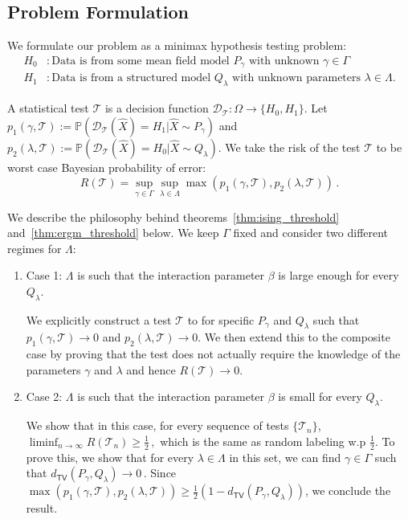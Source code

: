 \documentclass[final,12pt]{colt2018}
\begin{document}
\subsection{Problem Formulation}
We formulate our problem as a minimax hypothesis testing problem:
\begin{align*}
H_0 &: \text{Data is from some mean field model $P_\gamma$ with unknown $\gamma\in \Gamma$} \\
H_1 &: \text{Data is from a structured model $Q_{\lambda}$ with unknown parameters $\lambda \in \Lambda $.}
\end{align*}



A statistical test $\mathcal{T}$ is a decision function $\mathcal{D}_{\mathcal{T}}:\Omega \to \{H_0,H_1\}$. Let $p_1(\gamma, \mathcal{T}):= \mathbb{P}(\mathcal{D}_{\mathcal{T}}(\hat{X}) = H_1| \hat{X} \sim P_{\gamma})$ and $p_2(\lambda,\mathcal{T}) := \mathbb{P}(\mathcal{D}_{\mathcal{T}}(\hat{X}) = H_0| \hat{X} \sim Q_{\lambda})$. We take the risk of the test $\mathcal{T}$ to be worst case Bayesian probability of error:
$$R(\mathcal{T}) = \sup_{\gamma \in \Gamma}\sup_{\lambda \in \Lambda} \max(p_1(\gamma, \mathcal{T}),p_2(\lambda, \mathcal{T}))\,.$$

We describe the philosophy behind theorems~\ref{thm:ising_threshold} and~\ref{thm:ergm_threshold} below. We keep $\Gamma$ fixed and consider two different regimes for $\Lambda$:
\begin{enumerate}
\item Case 1:
$\Lambda$ is such that the interaction parameter $\beta$ is large enough for every $Q_{\lambda}$. 

We explicitly construct a test  $\mathcal{T}$ to for specific $P_{\gamma}$ and $Q_{\lambda}$ such that $p_1(\gamma,\mathcal{T}) \to 0$ and $p_2(\lambda, \mathcal{T})\to 0$. We then extend this to the composite case by proving that the test does not actually require the knowledge of the parameters $\gamma$ and $\lambda$ and hence $R(\mathcal{T}) \to 0$.
\item
Case 2: 
$\Lambda$ is such that the interaction parameter $\beta$ is small for every $Q_{\lambda}$.

We show that in this case, for every sequence of tests $\{\mathcal{T}_n\}$, $ \liminf_{n\to \infty} R(\mathcal{T}_n) \geq \frac{1}{2}\,,$ which is the same as random labeling w.p $\frac{1}{2}$. To prove this, we show that for every $\lambda \in \Lambda$ in this set, we can find $\gamma \in \Gamma$ such that $d_{\mathsf{TV}}(P_{\gamma},Q_{\lambda}) \to 0\,.$
Since $\max(p_1(\gamma, \mathcal{T}),p_2(\lambda, \mathcal{T})) \geq \frac{1}{2}(1-d_{\mathsf{TV}}(P_{\gamma},Q_{\lambda}))$, we conclude the result.
\end{enumerate}
\end{document}
